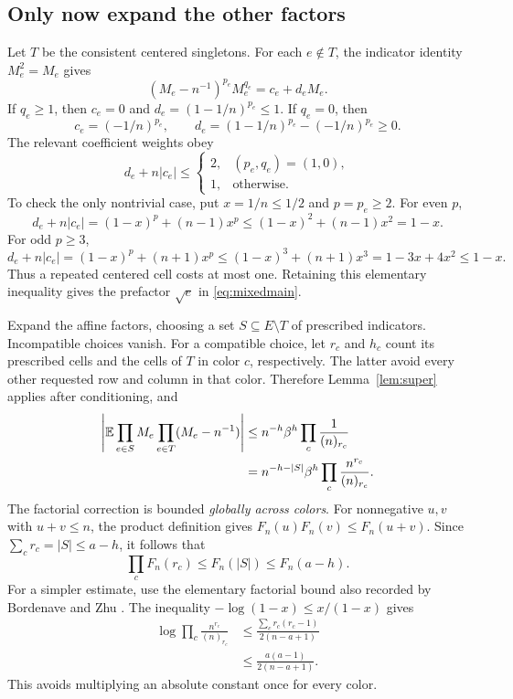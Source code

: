 \subsection{Only now expand the other factors}

Let $T$ be the consistent centered singletons. For each $e\notin T$, the indicator identity $M_e^2=M_e$ gives
\[
(M_e-n^{-1})^{p_e}M_e^{q_e}=c_e+d_eM_e.
\]
If $q_e\ge1$, then $c_e=0$ and $d_e=(1-1/n)^{p_e}\le1$. If $q_e=0$, then
\[
c_e=(-1/n)^{p_e},\qquad d_e=(1-1/n)^{p_e}-(-1/n)^{p_e}\ge0.
\]
The relevant coefficient weights obey
\begin{equation}\label{eq:weights}
d_e+n|c_e|\le
\begin{cases}
2,& (p_e,q_e)=(1,0),\\
1,& \text{otherwise}.
\end{cases}
\end{equation}
To check the only nontrivial case, put $x=1/n\le1/2$ and $p=p_e\ge2$. For even $p$,
\[
d_e+n|c_e|=(1-x)^p+(n-1)x^p
\le(1-x)^2+(n-1)x^2=1-x.
\]
For odd $p\ge3$,
\[
d_e+n|c_e|=(1-x)^p+(n+1)x^p
\le(1-x)^3+(n+1)x^3=1-3x+4x^2\le1-x.
\]
Thus a repeated centered cell costs at most one. Retaining this elementary inequality gives the prefactor $\sqrt e$ in \eqref{eq:mixedmain}.

Expand the affine factors, choosing a set $S\subseteq E\setminus T$ of prescribed indicators. Incompatible choices vanish. For a compatible choice, let $r_c$ and $h_c$ count its prescribed cells and the cells of $T$ in color $c$, respectively. The latter avoid every other requested row and column in that color. Therefore Lemma~\ref{lem:super} applies after conditioning, and
\begin{align}
\left|\mathbb E\prod_{e\in S}M_e\prod_{e\in T}(M_e-n^{-1})\right|
&\le n^{-h}\beta^h\prod_c\frac1{(n)_{r_c}}\notag\\
&=n^{-h-|S|}\beta^h\prod_c\frac{n^{r_c}}{(n)_{r_c}}.\label{eq:prescribed}
\end{align}
The factorial correction is bounded \emph{globally across colors}. For nonnegative $u,v$ with $u+v\le n$, the product definition gives $F_n(u)F_n(v)\le F_n(u+v)$. Since $\sum_c r_c=|S|\le a-h$, it follows that
\[
\prod_c F_n(r_c)\le F_n(|S|)\le F_n(a-h).
\]
For a simpler estimate, use the elementary factorial bound also recorded by Bordenave and Zhu \cite[Lemma 2.1, equation (2.3)]{BZ}. The inequality $-\log(1-x)\le x/(1-x)$ gives
\begin{align*}
\log\prod_c\frac{n^{r_c}}{(n)_{r_c}}
&\le\frac{\sum_c r_c(r_c-1)}{2(n-a+1)}\\
&\le\frac{a(a-1)}{2(n-a+1)}.
\end{align*}
This avoids multiplying an absolute constant once for every color.

